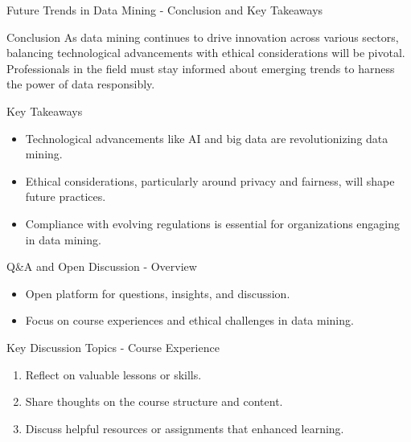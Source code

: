 \documentclass[aspectratio=169]{beamer}
\begin{document}
\begin{frame}[fragile]{Future Trends in Data Mining - Conclusion and Key Takeaways}
    \begin{block}{Conclusion}
        As data mining continues to drive innovation across various sectors, balancing technological advancements with ethical considerations will be pivotal. Professionals in the field must stay informed about emerging trends to harness the power of data responsibly.
    \end{block}

    \begin{block}{Key Takeaways}
        \begin{itemize}
            \item Technological advancements like AI and big data are revolutionizing data mining.
            \item Ethical considerations, particularly around privacy and fairness, will shape future practices.
            \item Compliance with evolving regulations is essential for organizations engaging in data mining.
        \end{itemize}
    \end{block}
\end{frame}

\begin{frame}[fragile]{Q\&A and Open Discussion - Overview}
    \begin{itemize}
        \item Open platform for questions, insights, and discussion.
        \item Focus on course experiences and ethical challenges in data mining.
    \end{itemize}
\end{frame}

\begin{frame}[fragile]{Key Discussion Topics - Course Experience}
    \begin{enumerate}
        \item Reflect on valuable lessons or skills.
        \item Share thoughts on the course structure and content.
        \item Discuss helpful resources or assignments that enhanced learning.
    \end{enumerate}
\end{frame}
\end{document}
